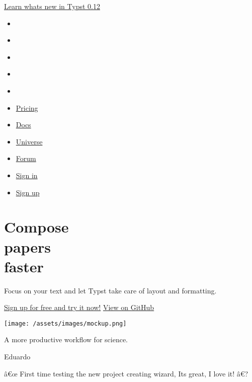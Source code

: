 \href{https://typst.app/blog/2024/typst-0.12/}{Learn
what\textquotesingle s new in Typst 0.12}

\href{/\#start}{}

\begin{itemize}
\tightlist
\item
  \href{https://github.com/typst/}{}
\item
  \href{https://discord.gg/2uDybryKPe}{}
\item
  \href{https://mastodon.social/@typst}{}
\item
  \href{https://bsky.app/profile/typst.app}{}
\item
  \href{https://www.linkedin.com/company/typst/}{}
\item
  \href{/pricing/}{Pricing}
\item
  \href{/docs/}{Docs}
\item
  \href{/universe/}{Universe}
\item
  \href{https://forum.typst.app}{Forum}
\item
  \href{/signin/}{Sign in}
\item
  \label{header-btn}\href{/signup}{Sign up}
\end{itemize}

\label{start}
\section[Compose\\
\strut \\
faster]{\texorpdfstring{Compose\\
\protect\hypertarget{change}{}{ { papers } }\\
faster}{Compose   papers   faster}}\label{compose-papers-faster}

Focus on your text and let Typst take care of layout and formatting.

\href{/signup}{Sign up for free and try it now!}
\href{https://github.com/typst/typst}{View on GitHub}

\texttt{[image: /assets/images/mockup.png]}

\label{social-proof}
A more productive workflow for science.

Eduardo

â€œ First time testing the new project creating wizard,
It\textquotesingle s great, I love it! â€?

